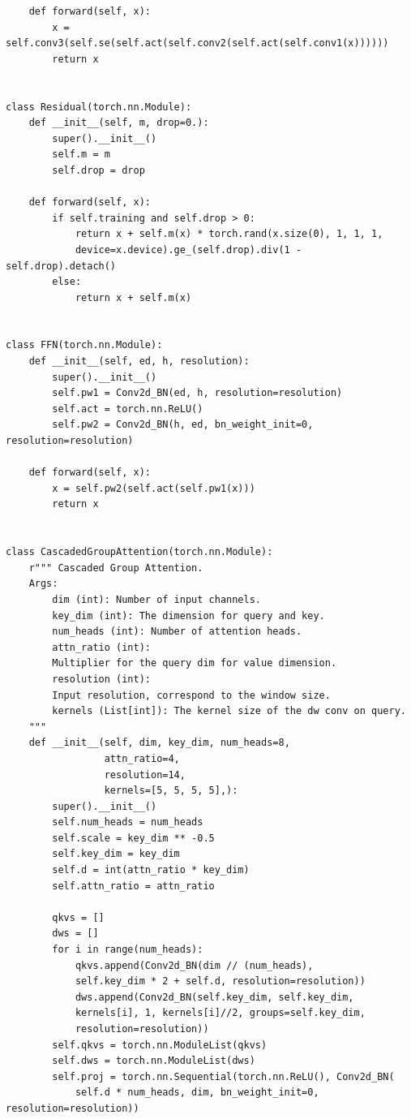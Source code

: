 \documentclass[12pt]{ctexart}
\begin{document}
\begin{lstlisting}
    def forward(self, x):
        x = self.conv3(self.se(self.act(self.conv2(self.act(self.conv1(x))))))
        return x
 
 
class Residual(torch.nn.Module):
    def __init__(self, m, drop=0.):
        super().__init__()
        self.m = m
        self.drop = drop
 
    def forward(self, x):
        if self.training and self.drop > 0:
            return x + self.m(x) * torch.rand(x.size(0), 1, 1, 1,
            device=x.device).ge_(self.drop).div(1 - self.drop).detach()
        else:
            return x + self.m(x)
 
 
class FFN(torch.nn.Module):
    def __init__(self, ed, h, resolution):
        super().__init__()
        self.pw1 = Conv2d_BN(ed, h, resolution=resolution)
        self.act = torch.nn.ReLU()
        self.pw2 = Conv2d_BN(h, ed, bn_weight_init=0, resolution=resolution)
 
    def forward(self, x):
        x = self.pw2(self.act(self.pw1(x)))
        return x
 
 
class CascadedGroupAttention(torch.nn.Module):
    r""" Cascaded Group Attention.
    Args:
        dim (int): Number of input channels.
        key_dim (int): The dimension for query and key.
        num_heads (int): Number of attention heads.
        attn_ratio (int): 
        Multiplier for the query dim for value dimension.
        resolution (int): 
        Input resolution, correspond to the window size.
        kernels (List[int]): The kernel size of the dw conv on query.
    """
    def __init__(self, dim, key_dim, num_heads=8,
                 attn_ratio=4,
                 resolution=14,
                 kernels=[5, 5, 5, 5],):
        super().__init__()
        self.num_heads = num_heads
        self.scale = key_dim ** -0.5
        self.key_dim = key_dim
        self.d = int(attn_ratio * key_dim)
        self.attn_ratio = attn_ratio
 
        qkvs = []
        dws = []
        for i in range(num_heads):
            qkvs.append(Conv2d_BN(dim // (num_heads), 
            self.key_dim * 2 + self.d, resolution=resolution))
            dws.append(Conv2d_BN(self.key_dim, self.key_dim, 
            kernels[i], 1, kernels[i]//2, groups=self.key_dim, 
            resolution=resolution))
        self.qkvs = torch.nn.ModuleList(qkvs)
        self.dws = torch.nn.ModuleList(dws)
        self.proj = torch.nn.Sequential(torch.nn.ReLU(), Conv2d_BN(
            self.d * num_heads, dim, bn_weight_init=0, resolution=resolution))
 

\end{lstlisting}
\end{document}
